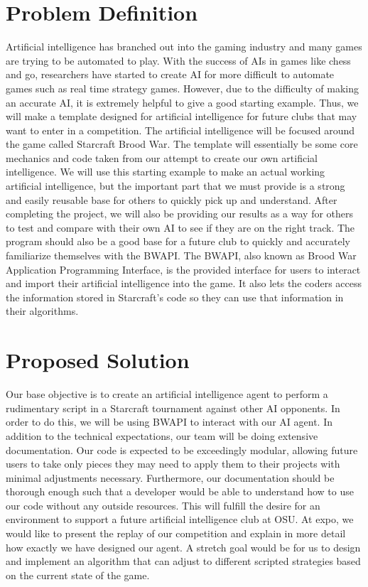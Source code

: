 \documentclass[10pt,letterpaper,onecolumn,draftclsnofoot]{IEEEtran}
\begin{document}
\section{Problem Definition}
Artificial intelligence has branched out into the gaming industry and many games are trying to be automated to play. With the success of AIs in games like chess and go, researchers have started to create AI for more difficult to automate games such as real time strategy games. However, due to the difficulty of making an accurate AI, it is extremely helpful to give a good starting example. Thus, we will make a template designed for artificial intelligence for future clubs that may want to enter in a competition. The artificial intelligence will be focused around the game called Starcraft Brood War. The template will essentially be some core mechanics and code taken from our attempt to create our own artificial intelligence. We will use this starting example to make an actual working artificial intelligence, but the important part that we must provide is a strong and easily reusable base for others to quickly pick up and understand. After completing the project, we will also be providing our results as a way for others to test and compare with their own AI to see if they are on the right track. The program should also be a good base for a future club to quickly and accurately familiarize themselves with the BWAPI. The BWAPI, also known as Brood War Application Programming Interface, is the provided interface for users to interact and import their artificial intelligence into the game. It also lets the coders access the information stored in Starcraft's code so they can use that information in their algorithms.

\section{Proposed Solution}
Our base objective is to create an artificial intelligence agent to perform a rudimentary script in a Starcraft tournament against other AI opponents. In order to do this, we will be using BWAPI to interact with our AI agent. In addition to the technical expectations, our team will be doing extensive documentation. Our code is expected to be exceedingly modular, allowing future users to take only pieces they may need to apply them to their projects with minimal adjustments necessary. Furthermore, our documentation should be thorough enough such that a developer would be able to understand how to use our code without any outside resources. This will fulfill the desire for an environment to support a future artificial intelligence club at OSU. At expo, we would like to present the replay of our competition and explain in more detail how exactly we have designed our agent. A stretch goal would be for us to design and implement an algorithm that can adjust to different scripted strategies based on the current state of the game. 
\end{document}

